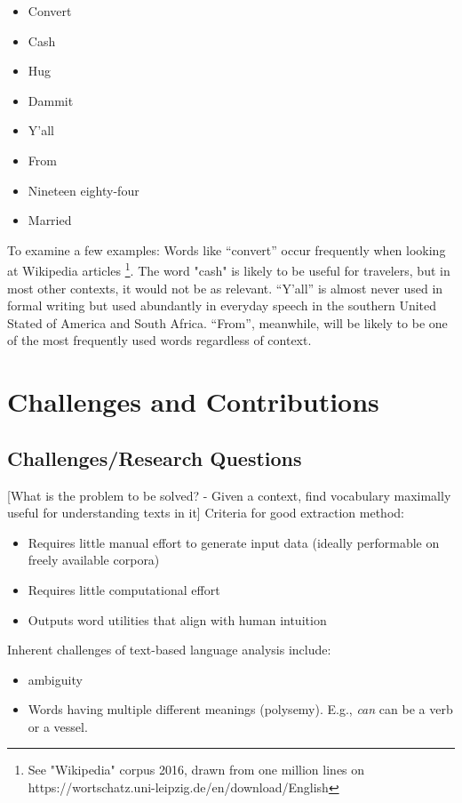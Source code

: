 \begin{itemize}
	\item Convert
	\item Cash
	\item Hug
	\item Dammit
	\item Y'all
	\item From
	\item Nineteen eighty-four
	\item Married
\end{itemize}

To examine a few examples: Words like “convert” occur frequently when looking at Wikipedia articles \footnote{See "Wikipedia" corpus 2016, drawn from one million lines on https://wortschatz.uni-leipzig.de/en/download/English}. The word "cash" is likely to be useful for travelers, but in most other contexts, it would not be as relevant. “Y’all” is almost never used in formal writing but used abundantly in everyday speech in the southern United Stated of America and South Africa. “From”, meanwhile, will be likely to be one of the most frequently used words regardless of context.

\section{Challenges and Contributions}

\subsection{Challenges/Research Questions}
[What is the problem to be solved? - Given a context, find vocabulary maximally useful for understanding texts in it]
Criteria for good extraction method:
\begin{itemize}
	\item Requires little manual effort to generate input data (ideally performable on freely available corpora)
	\item Requires little computational effort
	\item Outputs word utilities that align with human intuition 
\end{itemize}

Inherent challenges of text-based language analysis include:
\begin{itemize}
	\item ambiguity
	\item Words having multiple different meanings (polysemy). E.g., \textit{can} can be a verb or a vessel.
\end{itemize}

